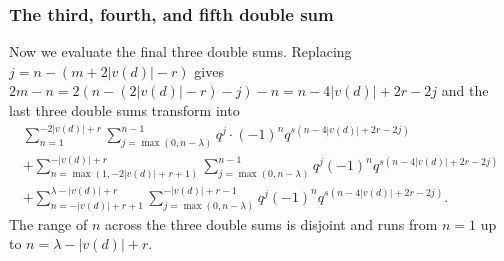 \subsubsection{The third, fourth, and fifth double sum}
Now we evaluate the final three double sums.
Replacing $j = n - (m + 2 |v(d)| - r)$ gives
$2m-n = 2(n - (2|v(d)| - r) - j) - n = n - 4|v(d)| + 2r - 2j$ and
the last three double sums transform into
\begin{align*}
  \sum_{n=1}^{-2|v(d)|+r}
    \sum_{j=\max(0, n-\lambda)}^{n-1}
    q^j \cdot (-1)^n q^{s(n-4|v(d)|+2r-2j)} \\
  + \sum_{n=\max(1, -2|v(d)|+r+1)}^{-|v(d)|+r}
    \sum_{j=\max(0, n-\lambda)}^{n-1}
    q^j (-1)^n q^{s(n-4|v(d)|+2r-2j)} \\
  + \sum_{n=-|v(d)|+r+1}^{\lambda-|v(d)|+r}
    \sum_{j=\max(0, n -\lambda)}^{-|v(d)|+r-1}
    q^j (-1)^n q^{s(n-4|v(d)|+2r-2j)}.
\end{align*}
The range of $n$ across the three double sums is disjoint
and runs from $n = 1$ up to $n = \lambda - |v(d)| + r$.

